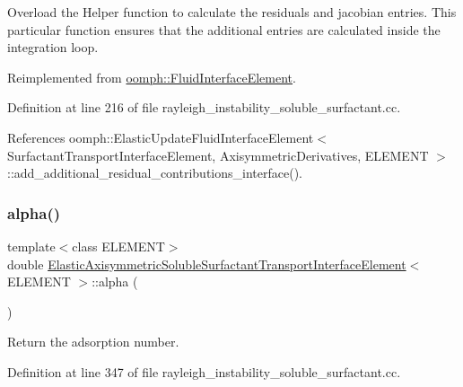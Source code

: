 Overload the Helper function to calculate the residuals and jacobian entries. This particular function ensures that the additional entries are calculated inside the integration loop. 



Reimplemented from \hyperlink{classoomph_1_1FluidInterfaceElement_a0bc278bb201b861f47dc846453be4c06}{oomph\+::\+Fluid\+Interface\+Element}.



Definition at line 216 of file rayleigh\+\_\+instability\+\_\+soluble\+\_\+surfactant.\+cc.



References oomph\+::\+Elastic\+Update\+Fluid\+Interface\+Element$<$ Surfactant\+Transport\+Interface\+Element, Axisymmetric\+Derivatives, E\+L\+E\+M\+E\+N\+T $>$\+::add\+\_\+additional\+\_\+residual\+\_\+contributions\+\_\+interface().

\mbox{\label{classElasticAxisymmetricSolubleSurfactantTransportInterfaceElement_a5cf569c81997dde4f4f2a8d5ee1069ca}} 
\subsubsection{\texorpdfstring{alpha()}{alpha()}}
{\footnotesize\ttfamily template$<$class E\+L\+E\+M\+E\+NT$>$ \\
double \hyperlink{classElasticAxisymmetricSolubleSurfactantTransportInterfaceElement}{Elastic\+Axisymmetric\+Soluble\+Surfactant\+Transport\+Interface\+Element}$<$ E\+L\+E\+M\+E\+NT $>$\+::alpha (\begin{DoxyParamCaption}{ }\end{DoxyParamCaption})\hspace{0.3cm}{\ttfamily [inline]}}



Return the adsorption number. 



Definition at line 347 of file rayleigh\+\_\+instability\+\_\+soluble\+\_\+surfactant.\+cc.

\mbox{\label{classElasticAxisymmetricSolubleSurfactantTransportInterfaceElement_a29024a8b66da3d19bd199130e3c04d81}} 
